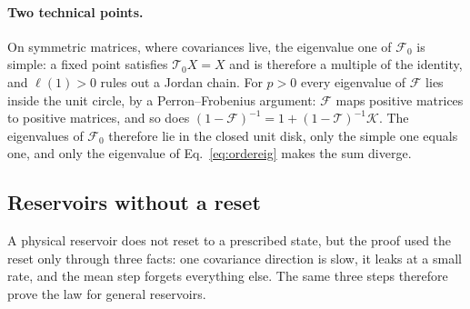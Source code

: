 \paragraph{Two technical points.}
On symmetric matrices, where covariances live, the eigenvalue one of $\mathcal F_0$ is simple: a fixed point
satisfies $\mathcal T_0X=X$ and is
therefore a multiple of the identity, and $\ell(1)>0$ rules out a Jordan chain. For $p>0$ every eigenvalue of
$\mathcal F$ lies inside the unit circle, by a Perron--Frobenius argument: $\mathcal F$ maps positive matrices to
positive matrices, and so does $(1-\mathcal F)^{-1}=1+(1-\mathcal T)^{-1}\mathcal K$. The eigenvalues of
$\mathcal F_0$ therefore lie in the closed unit disk, only the simple one equals one, and only the eigenvalue of
Eq.~\eqref{eq:ordereig} makes the sum diverge.

\subsection{Reservoirs without a reset}
\label{app:physical}
A physical reservoir does not reset to a prescribed state, but the proof used the reset only through three facts: one
covariance direction is slow, it leaks at a small rate, and the mean step forgets everything else. The same three
steps therefore prove the law for general reservoirs.

